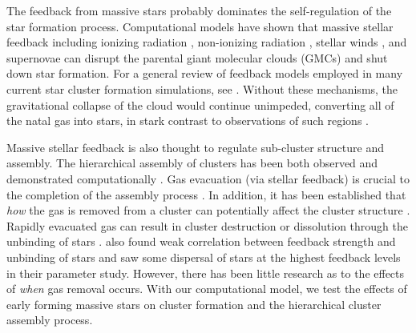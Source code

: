 \documentclass[twoside]{drexel-thesis}
\begin{document}
\begin{thesis}
The feedback from massive stars probably dominates the self-regulation of the star formation process. Computational models have shown that massive stellar feedback including ionizing radiation \citep{matzner_role_2002, dale_ionizing_2012}, non-ionizing radiation \citep{howard_universal_2018}, stellar winds \citep{dale_before_2014, rahner_winds_2017}, and supernovae \citep{rogers_feedback_2013, smith_supernova_2018} can disrupt the parental giant molecular clouds (GMCs) and shut down star formation. For a general review of feedback models employed in many current star cluster formation simulations, see \citet{dale_modelling_2015}. Without these mechanisms, the gravitational collapse of the cloud would continue unimpeded, converting all of the natal gas into stars, in stark contrast to observations of such regions \citep{ostriker_regulation_2010,chevance_life_2022}. 
 
Massive stellar feedback is also thought to regulate sub-cluster structure and assembly. The hierarchical assembly of clusters has been both observed \citep{bressert_spatial_2010, longmore_formation_2014, gouliermis_hierarchical_2017} and demonstrated computationally \citep{maschberger_properties_2010, howard_universal_2018, grudic_top_2018, vazquez-semadeni_hierarchical_2017, vazquez-semadeni_global_2019, chen_effects_2021, dobbs_formation_2022, guszejnov_cluster_2022}. Gas evacuation (via stellar feedback) is crucial to the completion of the assembly process \citep{grudic_top_2018,krause_physics_2020}. In addition, it has been established that \emph{how} the gas is removed from a cluster can potentially affect the cluster structure \citep{smith_infant_2013}. Rapidly evacuated gas can result in cluster destruction or dissolution through the unbinding of stars \citep{lada_embedded_2003,portegies_zwart_young_2010, banerjee_how_2017}. \citet{gavagnin_star_2017} also found weak correlation between feedback strength and unbinding of stars and \citet{li_disruption_2019} saw some dispersal of stars at the highest feedback levels in their parameter study. However, there has been little research as to the effects of \emph{when} gas removal occurs. With our computational model, we test the effects of early forming massive stars on cluster formation and the hierarchical cluster assembly process.
 

\end{thesis}
\end{document}
